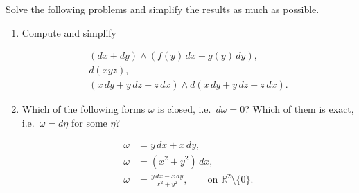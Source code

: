 \begin{Problem}

Solve the following problems and simplify the results as much as possible.

\begin{enumerate}

\item[(a)] Compute and simplify

\begin{align}
(dx+dy)\wedge\left(f(y)\,dx+g(y)\,dy\right), \\
d(xyz), \\
(x\,dy+y\,dz+z\,dx)\wedge d(x\,dy+y\,dz+z\,dx).
\end{align}

\item[(b)] Which of the following forms $\omega$ is closed, i.e.\ $d\omega=0$? Which of them is exact, i.e.\ $\omega=d\eta$ for some $\eta$?

\begin{align}
\omega &= y\,dx+x\,dy, \\
\omega &= (x^2+y^2)\,dx, \\
\omega &= \frac{y\,dx-x\,dy}{x^2+y^2},
\qquad \text{on } \mathbb{R}^2\setminus\{0\}.
\end{align}

\end{enumerate}

\end{Problem}

